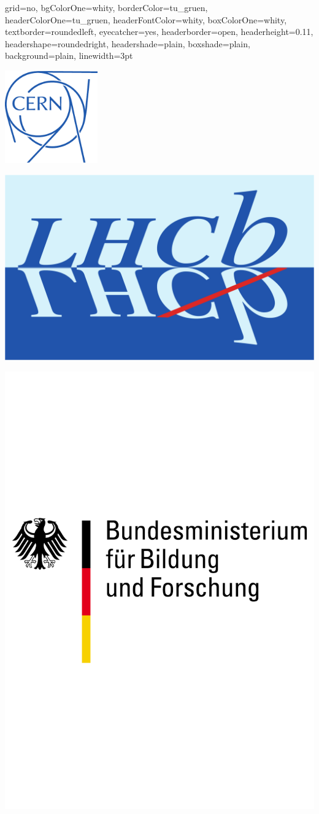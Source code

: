 \documentclass[a0poster,portrait,final,movebody=-5pt]{baposter}
\begin{document}
\newlength{\leftimgwidth}
\begin{poster}%
  {
  grid=no,
  bgColorOne=whity,%
  borderColor=tu_gruen,
  headerColorOne=tu_gruen,
  headerFontColor=whity,
  boxColorOne=whity,
  textborder=roundedleft,
  eyecatcher=yes,
  headerborder=open,
  headerheight=0.11\textheight,
  headershape=roundedright,
  headershade=plain,
  boxshade=plain,
  background=plain,
  linewidth=3pt
  }%
{\begin{minipage}[c]{0.20\textwidth}
\vspace{-1.6cm}
\includegraphics[width=0.3\textwidth]{figures/CERNLogoOutline.pdf}
\end{minipage}
\begin{minipage}[c]{0.20\textwidth}
\vspace{-1.6cm}\hspace{-1.8cm}
\includegraphics[height=0.3\textwidth]{figures/lhcb-logo.pdf}
\end{minipage}
\begin{minipage}[c]{0.20\textwidth}
\vspace{-1.6cm}\hspace{-2.5cm}
\includegraphics[height=0.3\textwidth]{figures/BMBF.pdf}

\end{minipage}}
\end{poster}
\end{document}
